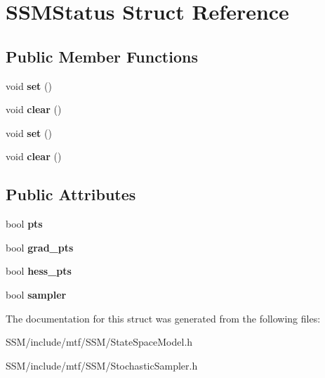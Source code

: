 \hypertarget{structSSMStatus}{\section{S\-S\-M\-Status Struct Reference}
\label{structSSMStatus}
}
\subsection*{Public Member Functions}
\begin{DoxyCompactItemize}
\item 
\hypertarget{structSSMStatus_a6b7c2697aa33c7345ccb25b7d0c785e3}{void {\bfseries set} ()}\label{structSSMStatus_a6b7c2697aa33c7345ccb25b7d0c785e3}

\item 
\hypertarget{structSSMStatus_a7a2dbb86193b875f174b89ee8eed53c0}{void {\bfseries clear} ()}\label{structSSMStatus_a7a2dbb86193b875f174b89ee8eed53c0}

\item 
\hypertarget{structSSMStatus_a6b7c2697aa33c7345ccb25b7d0c785e3}{void {\bfseries set} ()}\label{structSSMStatus_a6b7c2697aa33c7345ccb25b7d0c785e3}

\item 
\hypertarget{structSSMStatus_a7a2dbb86193b875f174b89ee8eed53c0}{void {\bfseries clear} ()}\label{structSSMStatus_a7a2dbb86193b875f174b89ee8eed53c0}

\end{DoxyCompactItemize}
\subsection*{Public Attributes}
\begin{DoxyCompactItemize}
\item 
\hypertarget{structSSMStatus_a9e6f7e975262d5df5e6f44ac84fdac32}{bool {\bfseries pts}}\label{structSSMStatus_a9e6f7e975262d5df5e6f44ac84fdac32}

\item 
\hypertarget{structSSMStatus_a7bf4e5df634f85927dfeb9f8c73d5b62}{bool {\bfseries grad\-\_\-pts}}\label{structSSMStatus_a7bf4e5df634f85927dfeb9f8c73d5b62}

\item 
\hypertarget{structSSMStatus_a9139b433890e6f838d027e0edac6493b}{bool {\bfseries hess\-\_\-pts}}\label{structSSMStatus_a9139b433890e6f838d027e0edac6493b}

\item 
\hypertarget{structSSMStatus_a9f9ee5b7371c619146c25a76b06c36df}{bool {\bfseries sampler}}\label{structSSMStatus_a9f9ee5b7371c619146c25a76b06c36df}

\end{DoxyCompactItemize}


The documentation for this struct was generated from the following files\-:\begin{DoxyCompactItemize}
\item 
S\-S\-M/include/mtf/\-S\-S\-M/State\-Space\-Model.\-h\item 
S\-S\-M/include/mtf/\-S\-S\-M/Stochastic\-Sampler.\-h\end{DoxyCompactItemize}
